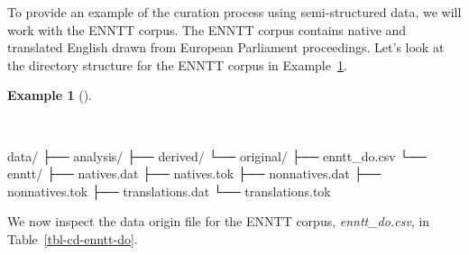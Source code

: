 \documentclass[
  letterpaper,
]{latex/krantz}
\newenvironment{Shaded}{\begin{snugshade}}{\end{snugshade}}
\newcommand{\ExtensionTok}[1]{\textcolor[rgb]{0.00,0.00,0.00}{#1}}
\newcommand{\NormalTok}[1]{\textcolor[rgb]{0.00,0.00,0.00}{#1}}
\theoremstyle{definition}
\newtheorem{example}{Example}[chapter]
\theoremstyle{remark}
\begin{document}
To provide an example of the curation process using semi-structured
data, we will work with the ENNTT corpus. The ENNTT corpus contains
native and translated English drawn from European Parliament
proceedings. Let's look at the directory structure for the ENNTT corpus
in Example~\ref{exm-cd-enntt-structure}.

\begin{example}[]\protect\hypertarget{exm-cd-enntt-structure}{}\label{exm-cd-enntt-structure}

~

\begin{Shaded}
\begin{Highlighting}[]
\ExtensionTok{data/}
\ExtensionTok{├──}\NormalTok{ analysis/}
\ExtensionTok{├──}\NormalTok{ derived/}
\ExtensionTok{└──}\NormalTok{ original/}
    \ExtensionTok{├──}\NormalTok{ enntt\_do.csv}
    \ExtensionTok{└──}\NormalTok{ enntt/}
        \ExtensionTok{├──}\NormalTok{ natives.dat}
        \ExtensionTok{├──}\NormalTok{ natives.tok}
        \ExtensionTok{├──}\NormalTok{ nonnatives.dat}
        \ExtensionTok{├──}\NormalTok{ nonnatives.tok}
        \ExtensionTok{├──}\NormalTok{ translations.dat}
        \ExtensionTok{└──}\NormalTok{ translations.tok}
\end{Highlighting}
\end{Shaded}

\end{example}

We now inspect the data origin file for the ENNTT corpus,
\emph{enntt\_do.csv}, in Table~\ref{tbl-cd-enntt-do}.
\end{document}
